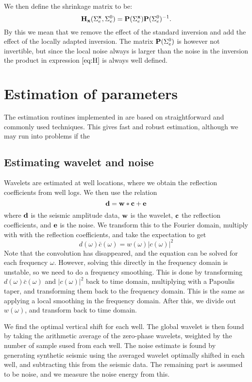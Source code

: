 We then define the shrinkage matrix to be:
\begin{equation}\label{eq:H}
\mathbf{H_x}(\Sigma_{e}^{\mathbf{x}},\Sigma_{e}^0) = \mathbf{P}(\Sigma_{e}^{\mathbf{x}})\mathbf{P}(\Sigma_{e}^0)^{-1}.
\end{equation}
By this we mean that we remove the effect of the standard inversion and add the effect of 
the locally adapted inversion. The matrix $\mathbf{P}(\Sigma_{e}^0)$ is however not invertible,
but since the local noise always is larger than the noise in the inversion the product in
expression $\ref{eq:H}$ is always well defined.
 

\section{Estimation of parameters}
\label{sec:estimateimp}
The estimation routines implemented in \crava are based on straightforward and commonly used techniques. This gives fast and robust estimation, although we may run into problems if the
\subsection{Estimating wavelet and noise}
\label{sec:waveestimp}
Wavelets are estimated at well locations, where we obtain the reflection coefficients from well logs. We then use the relation
\begin{equation}
\mathbf{d} = \mathbf{w}*\mathbf{c}+\mathbf{e}
\end{equation}
where $\mathbf{d}$ is the seismic amplitude data, $\mathbf{w}$ is the wavelet, $\mathbf{c}$ the reflection coefficients, and $\mathbf{e}$ is the noise. We transform this to the Fourier domain, multiply with with the reflection coefficients, and take the expectation to get
\begin{equation}
d(\omega)\bar{c}(\omega) = w(\omega)|c(\omega)|^2
\end{equation}
Note that the convolution has disappeared, and the equation can be solved for each frequency $\omega$. However, solving this directly in the frequency domain is unstable, so we need to do a frequency smoothing. This is done by transforming $d(\omega)\bar{c}(\omega)$ and $|c(\omega)|^2$ back to time domain, multiplying with a Papoulis taper, and transforming them back to the frequency domain. This is the same as applying a local smoothing in the frequency domain. After this, we divide out $w(\omega)$, and transform back to time domain.

We find the optimal vertical shift for each well. The global wavelet is then found by taking the arithmetic average of the zero-phase wavelets, weighted by the number of sample sused from each well. The noise estimate is found by generating synthetic seismic using the averaged wavelet optimally shifted in each well, and subtracting this from the seismic data. The remaining part is assumed to be noise, and we measure the noise energy from this.

